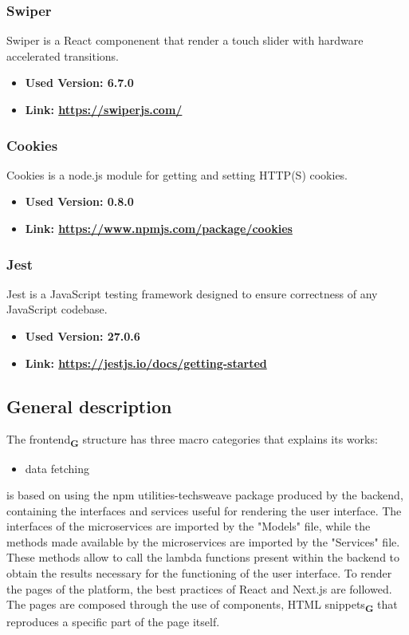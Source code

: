 \subsubsection{Swiper}
Swiper is a React componenent that render a touch slider with hardware accelerated transitions.
\begin{itemize}
  \item \textbf{Used Version: 6.7.0}
  \item \textbf{Link: \url{https://swiperjs.com/}}
\end{itemize}
\subsubsection{Cookies}
Cookies is a node.js module for getting and setting HTTP(S) cookies.
\begin{itemize}
  \item \textbf{Used Version: 0.8.0}
  \item \textbf{Link: \url{https://www.npmjs.com/package/cookies}}
\end{itemize}
\subsubsection{Jest}
Jest is a JavaScript testing framework designed to ensure correctness of any JavaScript codebase.
\begin{itemize}
  \item \textbf{Used Version: 27.0.6}
  \item \textbf{Link: \url{https://jestjs.io/docs/getting-started}}
\end{itemize}
\subsection{General description}
The frontend\textsubscript{\textbf{G}} structure has three macro categories that explains its works:
\begin{itemize}
  \item data fetching
\end{itemize}




is based on using the npm utilities-techsweave package produced by the backend, containing the interfaces and services useful for rendering the user interface. The interfaces of the microservices are imported by the "Models" file, while the methods made available by the microservices are imported by the "Services" file. These methods allow to call the lambda functions present within the backend to obtain the results necessary for the functioning of the user interface. To render the pages of the platform, the best practices of React and Next.js are followed. The pages are composed through the use of components, HTML snippets\textsubscript{\textbf{G}} that reproduces a specific part of the page itself.

